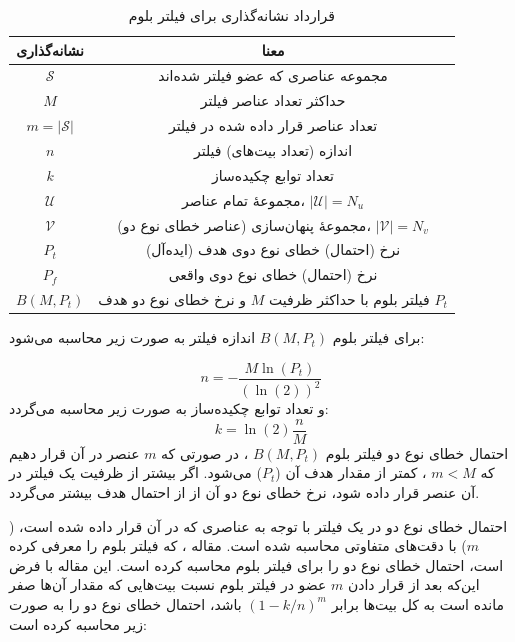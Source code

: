 \begin{table}[h]
	\centering
	\caption{قرارداد نشانه‌گذاری برای فیلتر بلوم}
	\label{table:BloomFilter}
	\begin{tabular}{|c|c|}
		\hline
		نشانه‌گذاری & معنا \\
		\hline
		\hline
		$\mathcal{S}$ & مجموعه عناصری که عضو فیلتر شده‌اند \\
		\hline
		$M$ & حداکثر تعداد عناصر فیلتر\\
		\hline
		$m = |\mathcal{S}|$ & تعداد عناصر قرار داده شده در فیلتر\\
		\hline
		$n$ & اندازه (تعداد بیت‌های) فیلتر \\
		\hline
		$k$ & تعداد توابع چکیده‌ساز\\
		\hline
		$\mathcal{U}$ & مجموعهٔ تمام عناصر، $|\mathcal{U}| = N_u$ \\
		\hline
		$\mathcal{V}$ & مجموعهٔ پنهان‌سازی (عناصر خطای نوع دو)، $|\mathcal{V}| = N_v$\\
		\hline
		$P_t$ & نرخ (احتمال) خطای نوع دوی هدف (ایده‌آل)\\
		\hline
		$P_f$ & نرخ (احتمال) خطای نوع دوی واقعی \\
		\hline
		$B(M, P_t)$ & فیلتر بلوم با حداکثر ظرفیت $M$ و نرخ خطای نوع دو هدف $P_t$ \\
		\hline
	\end{tabular}
\end{table}

برای فیلتر بلوم
$B(M, P_t)$
اندازه فیلتر به صورت زیر محاسبه می‌شود\cite{Gervais2014}:

\begin{equation}
n=-\frac{M\ln(P_t)}{\left(\ln(2)\right)^2} \label{eq:n_of_bloom_filter}
\end{equation}
و تعداد توابع چکیده‌ساز به صورت زیر محاسبه می‌گردد\cite{Gervais2014}:
\begin{equation}
k=\ln(2)\frac{n}{M} \label{eq:k_of_bloom_filter}
\end{equation}
احتمال خطای نوع دو فیلتر بلوم
$B(M, P_t)$
، در صورتی که $m$ عنصر در آن قرار دهیم که
$m<M$
، کمتر از مقدار هدف آن ($P_t$) می‌شود. اگر بیشتر از ظرفیت یک فیلتر در آن عنصر قرار داده شود،‌ نرخ خطای نوع دو آن از از احتمال هدف بیشتر می‌گردد.

احتمال خطای نوع دو در یک فیلتر با توجه به عناصری که در آن قرار داده شده است، ($m$) با دقت‌های متفاوتی محاسبه شده است. مقاله \cite{Bloom1970}، که فیلتر بلوم را معرفی کرده است، احتمال خطای نوع دو را برای فیلتر بلوم محاسبه کرده است. این مقاله با فرض این‌که بعد از قرار دادن $m$ عضو در فیلتر بلوم نسبت بیت‌هایی که مقدار آن‌ها صفر مانده است به کل بیت‌ها برابر
$(1-k/n)^m$
باشد، احتمال خطای نوع دو را به صورت زیر محاسبه کرده است:

